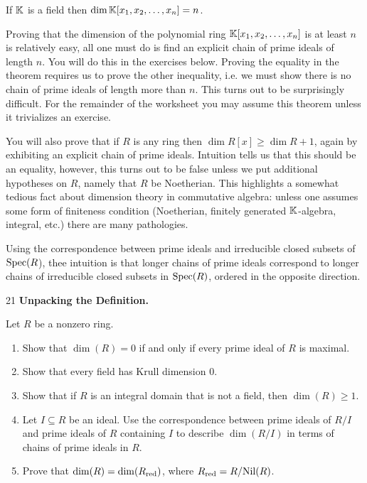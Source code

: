\documentclass[Notebook.tex]{subfiles}
\begin{document}
\begin{theorem}
	If $\mathbb K$ is a field then $\dim \mathbb K[x_1,x_2,\ldots,x_n]=n$.
\end{theorem}

Proving that the dimension of the polynomial ring $\mathbb K[x_1,x_2,\ldots,x_n]$ is at least $n$ is relatively easy, all one must do is find an explicit chain of prime ideals of length $n$. You will do this in the exercises below. Proving the equality in the theorem requires us to prove the other inequality, i.e. we must show there is no chain of prime ideals of length more than $n$. This turns out to be surprisingly difficult. For the remainder of the worksheet you may assume this theorem unless it trivializes an exercise. 

You will also prove that if $R$ is any ring then $\dim R[x] \geq \dim R + 1$, again by exhibiting an explicit chain of prime ideals. Intuition tells us that this should be an equality, however, this turns out to be false unless we put additional hypotheses on $R$, namely that $R$ be Noetherian. This highlights a somewhat tedious fact about dimension theory in commutative algebra: unless one assumes some form of finiteness condition (Noetherian, finitely generated $\mathbb K$-algebra, integral, etc.) there are many pathologies. 

Using the correspondence between prime ideals and irreducible closed subsets of $\operatorname{Spec}(R$), thee intuition is that longer chains of prime ideals correspond to longer chains of irreducible closed subsets in $\operatorname{Spec}(R)$, ordered in the opposite direction. 

\hrulefill

\newpage 

\begin{problem}{21} \textbf{Unpacking the Definition.} 
    
    Let $R$ be a nonzero ring.
    \begin{enumerate}
        \item Show that $\dim(R)=0$ if and only if every prime ideal of $R$ is maximal.
        \item Show that every field has Krull dimension $0$.
        \item Show that if $R$ is an integral domain that is not a field, then $\dim(R)\geq 1$.
        \item Let $I\subseteq R$ be an ideal. Use the correspondence between prime ideals of $R/I$ and prime ideals of $R$ containing $I$ to describe $\dim(R/I)$ in terms of chains of prime ideals in $R$.
        \item Prove that $\dim(R)=\dim(R_{\text{red}})$, where $R_{\text{red}}=R/\text{Nil}(R)$.
    \end{enumerate}    
\end{problem}
\end{document}
